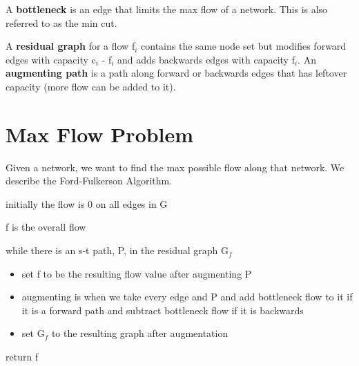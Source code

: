 A \textbf{bottleneck} is an edge that limits the max flow of a network. This is also referred to as the min cut.
 
A \textbf{residual graph} for a flow f$_i$ contains the same node set but modifies forward edges with capacity c$_i$ - f$_i$ and adds backwards edges with capacity f$_i$. An \textbf{augmenting path} is a path along forward or backwards edges that has leftover capacity (more flow can be added to it).

\section{Max Flow Problem}
Given a network, we want to find the max possible flow along that network. We describe the Ford-Fulkerson Algorithm.

\algorithm
{
    \item initially the flow is 0 on all edges in G
    \item f is the overall flow
    \item while there is an s-t path, P, in the residual graph G$_f$
    \begin{itemize}
        \item set f to be the resulting flow value after augmenting P
        \item augmenting is when we take every edge and P and add bottleneck flow to it if it is a forward path and subtract bottleneck flow if it is backwards
        \item set G$_f$ to the resulting graph after augmentation
    \end{itemize}
    \item return f
}
